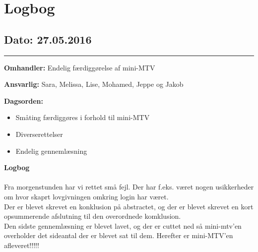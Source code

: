 \chapter{Logbog}

\section{Dato: 27.05.2016}
\hrule

\textbf{Omhandler:} Endelig færdiggørelse af mini-MTV

\textbf{Ansvarlig:} Sara, Melissa, Lise, Mohamed, Jeppe og Jakob

\textbf{Dagsorden:}
\begin{itemize}
	\item Småting færdiggøres i forhold til mini-MTV
	\item Diverserettelser
	\item Endelig gennemlæsning 
\end{itemize}

\textbf{Logbog}
\\
\\ 
Fra morgenstunden har vi rettet små fejl. Der har f.eks. været nogen usikkerheder om hvor skaprt lovgivningen omkring login har været. 
\\
Der er blevet skrevet en konklusion på abstractet, og der er blevet skrevet en kort opsummerende afslutning til den overordnede komklusion. 
\\
Den sidste gennemlæsning er blevet lavet, og der er cuttet ned så mini-mtv'en overholder det sideantal der er blevet sat til dem. Herefter er mini-MTV'en afleveret!!!!!